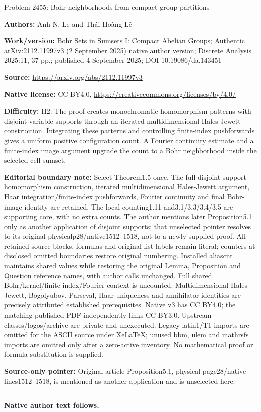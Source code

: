 \documentclass[10pt]{article}
\theoremstyle{definition}
\begin{document}
\begin{center}\Large Problem 2455: Bohr neighborhoods from compact-group partitions\end{center}\noindent\textbf{Authors:} Anh N. Le and Thái Hoàng Lê\par\noindent\textbf{Work/version:} Bohr Sets in Sumsets I: Compact Abelian Groups; Authentic arXiv:2112.11997v3 (2 September 2025) native author version; Discrete Analysis 2025:11, 37 pp.; published 4 September 2025; DOI 10.19086/da.143451\par\noindent\textbf{Source:} \url{https://arxiv.org/abs/2112.11997v3}\par\noindent\textbf{Native license:} CC BY4.0, \url{https://creativecommons.org/licenses/by/4.0/}\par\noindent\textbf{Difficulty:} H2: The proof creates monochromatic homomorphism patterns with disjoint variable supports through an iterated multidimensional Hales-Jewett construction. Integrating these patterns and controlling finite-index pushforwards gives a uniform positive configuration count. A Fourier continuity estimate and a finite-index image argument upgrade the count to a Bohr neighborhood inside the selected cell sumset.\par\medskip\noindent\textbf{Editorial boundary note:} Select Theorem1.5 once. The full disjoint-support homomorphism construction, iterated multidimensional Hales-Jewett argument, Haar integration/finite-index pushforwards, Fourier continuity and final Bohr-image identity are retained. The local counting1.11 and3.1/3.3/3.4/3.5 are supporting core, with no extra counts. The author mentions later Proposition5.1 only as another application of disjoint supports; that unselected pointer resolves to its original physicalp28/native1512–1518, not to a newly supplied proof. All retained source blocks, formulas and original list labels remain literal; counters at disclosed omitted boundaries restore original numbering. Installed aliascnt maintains shared values while restoring the original Lemma, Proposition and Question reference names, with author calls unchanged. Full shared Bohr/kernel/finite-index/Fourier context is uncounted. Multidimensional Hales-Jewett, Bogolyubov, Parseval, Haar uniqueness and annihilator identities are precisely attributed established prerequisites. Native v3 has CC BY4.0; the matching published PDF independently links CC BY3.0. Upstream classes/logos/archive are private and unexecuted. Legacy latin1/T1 imports are omitted for the ASCII source under XeLaTeX; unused bbm, ulem and mathrsfs imports are omitted only after a zero-active inventory. No mathematical proof or formula substitution is supplied.\par\noindent\hypertarget{source-prop-counting-brauer}{\textbf{Source-only pointer:} Original article Proposition5.1, physical page28/native lines1512--1518, is mentioned as another application and is unselected here.}\par\medskip\hrule\medskip\noindent\textbf{Native author text follows.}\par
\end{document}
